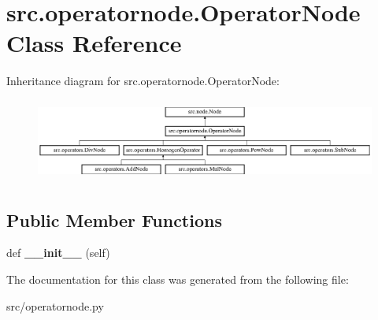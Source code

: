\hypertarget{classsrc_1_1operatornode_1_1OperatorNode}{}\section{src.\+operatornode.\+Operator\+Node Class Reference}
\label{classsrc_1_1operatornode_1_1OperatorNode}
Inheritance diagram for src.\+operatornode.\+Operator\+Node\+:\begin{figure}[H]
\begin{center}
\leavevmode
\includegraphics[height=2.745098cm]{classsrc_1_1operatornode_1_1OperatorNode}
\end{center}
\end{figure}
\subsection*{Public Member Functions}
\begin{DoxyCompactItemize}
\item 
\mbox{\label{classsrc_1_1operatornode_1_1OperatorNode_a8a52d701bbf1460c52777f16c510f184}} 
def {\bfseries \+\_\+\+\_\+init\+\_\+\+\_\+} (self)
\end{DoxyCompactItemize}


The documentation for this class was generated from the following file\+:\begin{DoxyCompactItemize}
\item 
src/operatornode.\+py\end{DoxyCompactItemize}
